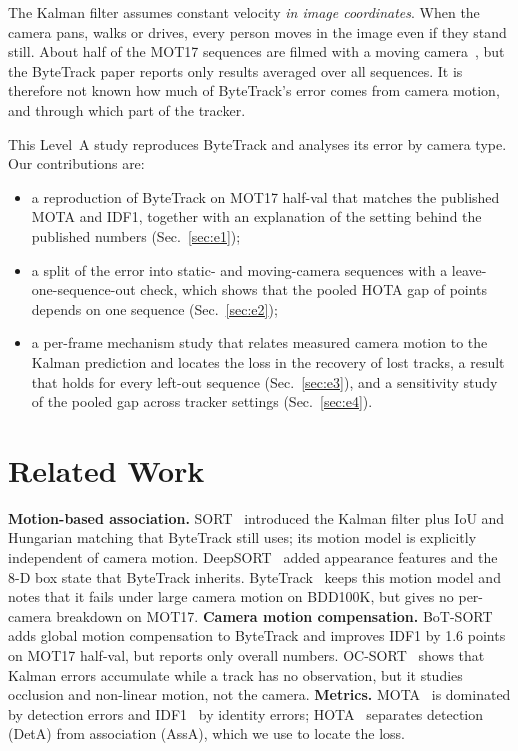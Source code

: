 \documentclass[conference]{IEEEtran}
\begin{document}
The Kalman filter assumes constant velocity \emph{in image coordinates}. When the camera pans, walks or drives, every
person moves in the image even if they stand still. About half of the MOT17 sequences are filmed with a moving
camera~\cite{milan2016mot16}, but the ByteTrack paper reports only results averaged over all sequences. It is therefore
not known how much of ByteTrack's error comes from camera motion, and through which part of the tracker.

This Level~A study reproduces ByteTrack and analyses its error by camera type. Our contributions are:
\begin{itemize}
\item a reproduction of ByteTrack on MOT17 half-val that matches the published MOTA and IDF1, together with an
explanation of the setting behind the published numbers (Sec.~\ref{sec:e1});
\item a split of the error into static- and moving-camera sequences with a leave-one-sequence-out check, which shows
that the pooled HOTA gap of \vGapHOTA{} points depends on one sequence (Sec.~\ref{sec:e2});
\item a per-frame mechanism study that relates measured camera motion to the Kalman prediction and locates the loss in
the recovery of lost tracks, a result that holds for every left-out sequence (Sec.~\ref{sec:e3}), and a
sensitivity study of the pooled gap across tracker settings (Sec.~\ref{sec:e4}).
\end{itemize}

\section{Related Work}
\textbf{Motion-based association.} SORT~\cite{bewley2016sort} introduced the Kalman filter plus IoU and Hungarian
matching that ByteTrack still uses; its motion model is explicitly independent of camera motion. DeepSORT~\cite{wojke2017deepsort}
added appearance features and the 8-D box state that ByteTrack inherits. ByteTrack~\cite{zhang2022bytetrack} keeps
this motion model and notes that it fails under large camera motion on BDD100K, but gives no per-camera breakdown on MOT17.
\textbf{Camera motion compensation.} BoT-SORT~\cite{aharon2022botsort} adds global motion compensation to ByteTrack and
improves IDF1 by 1.6 points on MOT17 half-val, but reports only overall numbers. OC-SORT~\cite{cao2023ocsort} shows that Kalman errors accumulate while a track has no observation, but it
studies occlusion and non-linear motion, not the camera.
\textbf{Metrics.} MOTA~\cite{bernardin2008clear} is dominated by detection errors and IDF1~\cite{ristani2016idf1} by
identity errors; HOTA~\cite{luiten2021hota} separates detection (DetA) from association (AssA), which we use to locate
the loss.
\end{document}
